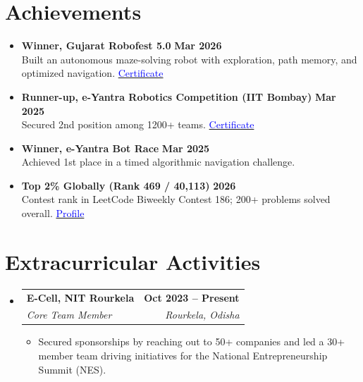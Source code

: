\documentclass[letterpaper,11pt]{article}
\makeatletter
\newcommand{\resumeItem}[1]{
  \item\small{
    {#1 \vspace{-2pt}}
  }
}
\newcommand{\resumeSubheading}[4]{
  \vspace{-2pt}\item
    \begin{tabular*}{1.0\textwidth}[t]{l@{\extracolsep{\fill}}r}
      \textbf{#1} & \textbf{\small #2} \\
      \textit{\small#3} & \textit{\small #4} \\
    \end{tabular*}\vspace{-7pt}
}
\newcommand{\resumeSubHeadingListStart}{\begin{itemize}[leftmargin=0.0in, label={}]}
\newcommand{\resumeSubHeadingListEnd}{\end{itemize}}
\newcommand{\resumeItemListStart}{\begin{itemize}}
\newcommand{\resumeItemListEnd}{\end{itemize}\vspace{-5pt}}
\makeatother
\begin{document}
\section{Achievements}
\begin{itemize}[leftmargin=0.35in, itemsep=2pt, label={\tiny$\bullet$}]

    \item \small\textbf{Winner, Gujarat Robofest 5.0} \hfill \small\textbf{Mar 2026} \\
    \small Built an autonomous maze-solving robot with exploration, path memory, and optimized navigation. \hfill
    \href{https://drive.google.com/file/d/1qMBY7NpupAS-StSLRKl7HkcCGk9RHLLh/view?usp=sharing}{\textcolor{blue}{Certificate}}

    \item \small\textbf{Runner-up, e-Yantra Robotics Competition (IIT Bombay)} \hfill \small\textbf{Mar 2025} \\
    \small Secured 2nd position among 1200+ teams. \hfill
    \href{https://drive.google.com/file/d/1Spg4E0pJioTLlNKW_KL8ts4B7_th_Z37/view?usp=sharing}{\textcolor{blue}{Certificate}}

    \item \small\textbf{Winner, e-Yantra Bot Race} \hfill \small\textbf{Mar 2025} \\
    \small Achieved 1st place in a timed algorithmic navigation challenge.

    \item \small\textbf{Top 2\% Globally (Rank 469 / 40,113)} \hfill \small\textbf{2026} \\
    \small Contest rank in LeetCode Biweekly Contest 186; 200+ problems solved overall. \hfill
    \href{https://leetcode.com/u/rajsrivastava3_0/}{\textcolor{blue}{Profile}}

\end{itemize}
\section{Extracurricular Activities}
    \resumeSubHeadingListStart
        \resumeSubheading{E-Cell, NIT Rourkela}{Oct 2023 -- Present}{Core Team Member}{Rourkela, Odisha}
            \resumeItemListStart
               \resumeItem{Secured sponsorships by reaching out to 50+ companies and led a 30+ member team driving initiatives for the National Entrepreneurship Summit (NES).}
            \resumeItemListEnd

    \resumeSubHeadingListEnd
\end{document}
